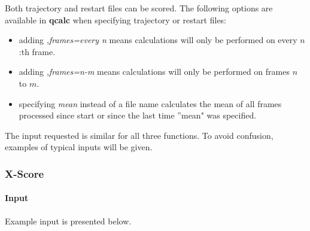 \documentclass[a4paper,10pt]{article}
\begin{document}
Both trajectory and restart files can be scored. The following options
are available in \textbf{qcalc}  when specifying trajectory or restart
files:
\begin{itemize}
  \item{adding \emph{,frames=every n} means  calculations will only be
performed on every $n$:th frame.}
  \item{adding  \emph{,frames=n-m}  means  calculations will  only  be
performed on frames $n$ to $m$.}
  \item{specifying \emph{mean}  instead of a file  name calculates the
mean  of all  frames  processed since  start or  since  the last  time
''mean" was specified.}
\end{itemize}

The  input requested  is similar  for  all three  functions. To  avoid
confusion, examples of typical inputs will be given.

\subsubsection{X-Score}

\paragraph{Input}
  Example input is presented below.
\end{document}
